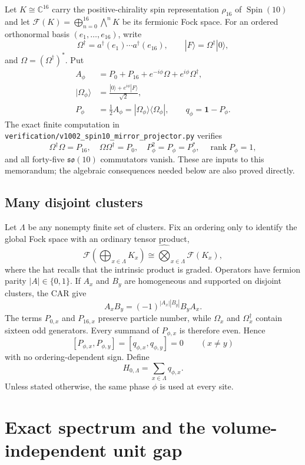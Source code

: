 \documentclass[11pt]{article}
\theoremstyle{remark}
\newcommand{\F}{\mathcal F}
\newcommand{\C}{\mathbb C}
\newcommand{\id}{\mathbf 1}
\newcommand{\rank}{\operatorname{rank}}
\begin{document}
Let $K\cong\C^{16}$ carry the positive-chirality spin representation
$\rho_{16}$ of $\operatorname{Spin}(10)$ and let
$\F(K)=\bigoplus_{n=0}^{16}\bigwedge^nK$ be its fermionic Fock space.
For an ordered orthonormal basis $(e_1,\ldots,e_{16})$, write
\[
 \Omega^\dagger
 =a^\dagger(e_1)\cdots a^\dagger(e_{16}),\qquad
 |F\rangle=\Omega^\dagger|0\rangle ,
\]
and $\Omega=(\Omega^\dagger)^*$.  Put
\[
\begin{aligned}
 A_\phi
 &=P_0+P_{16}+e^{-i\phi}\Omega+e^{i\phi}\Omega^\dagger,\\
 |\Omega_\phi\rangle
 &=\frac{|0\rangle+e^{i\phi}|F\rangle}{\sqrt2},\\
 P_\phi&=\frac12A_\phi
 =|\Omega_\phi\rangle\langle\Omega_\phi|,\qquad
 q_\phi=\id-P_\phi.
\end{aligned}
\tag{1.1}\label{eq:cluster}
\]
The exact finite computation in
\texttt{verification/v1002\_spin10\_mirror\_projector.py} verifies
\[
 \Omega^\dagger\Omega=P_{16},\quad
 \Omega\Omega^\dagger=P_0,\quad
 P_\phi^2=P_\phi=P_\phi^*,\quad
 \rank P_\phi=1,
\tag{1.2}\label{eq:frozen}
\]
and all forty-five $\mathfrak{so}(10)$ commutators vanish.  These are
inputs to this memorandum; the algebraic consequences needed below
are also proved directly.

\subsection{Many disjoint clusters}

Let $\Lambda$ be any nonempty finite set of clusters.  Fix an ordering
only to identify the global Fock space with an ordinary tensor product,
\[
 \F\!\left(\bigoplus_{x\in\Lambda}K_x\right)
 \cong\widehat{\bigotimes}_{x\in\Lambda}\F(K_x),
\tag{1.3}\label{eq:gradedtensor}
\]
where the hat recalls that the intrinsic product is graded.  Operators
have fermion parity $|A|\in\{0,1\}$.  If $A_x$ and $B_y$ are homogeneous
and supported on disjoint clusters, the CAR give
\[
 A_xB_y=(-1)^{|A_x||B_y|}B_yA_x.
\tag{1.4}\label{eq:gradedcommute}
\]
The terms $P_{0,x}$ and $P_{16,x}$ preserve particle number, while
$\Omega_x$ and $\Omega_x^\dagger$ contain sixteen odd generators.
Every summand of $P_{\phi,x}$ is therefore even.  Hence
\[
 [P_{\phi,x},P_{\phi,y}]=[q_{\phi,x},q_{\phi,y}]=0
 \qquad(x\ne y)
\tag{1.5}\label{eq:commute}
\]
with no ordering-dependent sign.  Define
\[
 H_{0,\Lambda}=\sum_{x\in\Lambda}q_{\phi,x}.
\tag{1.6}\label{eq:H0}
\]
Unless stated otherwise, the same phase $\phi$ is used at every site.

\section{Exact spectrum and the volume-independent unit gap}
\end{document}
